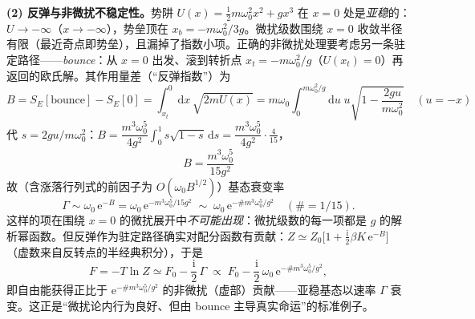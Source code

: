 \textbf{(2) 反弹与非微扰不稳定性。}势阱 $U(x)=\frac12m\omega_0^{2}x^{2}+gx^{3}$ 在 $x=0$ 处是\emph{亚稳}的：$U\to-\infty$（$x\to-\infty$），势垒顶在 $x_b=-m\omega_0^{2}/3g$。微扰级数围绕 $x=0$ 收敛半径有限（最近奇点即势垒），且漏掉了指数小项。正确的非微扰处理要考虑另一条驻定路径——\emph{bounce}：从 $x=0$ 出发、滚到转折点 $x_t=-m\omega_0^{2}/g$（$U(x_t)=0$）再返回的欧氏解。其作用量差（“反弹指数”）为
\begin{equation*}
B=S_E[\text{bounce}]-S_E[0]
=\int_{x_t}^{0}\mathrm{d}x\,\sqrt{2mU(x)}
=m\omega_0\int_0^{m\omega_0^{2}/g}\mathrm{d}u\;u\sqrt{1-\frac{2gu}{m\omega_0^{2}}}
\quad(u=-x)
\end{equation*}
代 $s=2gu/m\omega_0^{2}$：$B=\dfrac{m^{3}\omega_0^{5}}{4g^{2}}\int_0^1s\sqrt{1-s}\,\mathrm{d}s
=\dfrac{m^{3}\omega_0^{5}}{4g^{2}}\cdot\frac{4}{15}$，
\begin{equation*}
\boxed{\;B=\frac{m^{3}\omega_0^{5}}{15g^{2}}\;}
\end{equation*}
故（含涨落行列式的前因子为 $O(\omega_0 B^{1/2})$）基态衰变率
\begin{equation*}
\Gamma\sim\omega_0\,\mathrm{e}^{-B}
=\omega_0\,\mathrm{e}^{-m^{3}\omega_0^{5}/15g^{2}}
\;\sim\;\omega_0\,\mathrm{e}^{-\#m^{3}\omega_0^{5}/g^{2}}
\quad(\#=1/15) .
\end{equation*}
这样的项在围绕 $x=0$ 的微扰展开中\emph{不可能出现}：微扰级数的每一项都是 $g$ 的解析幂函数。但反弹作为驻定路径确实对配分函数有贡献：$Z\simeq Z_0\big[1+\frac{\mathrm{i}}{2}\beta K\,\mathrm{e}^{-B}\big]$（虚数来自反转点的半经典积分），于是
\begin{equation*}
F=-T\ln Z\simeq F_0-\frac{\mathrm{i}}{2}\,\Gamma\;\propto\;F_0-\frac{\mathrm{i}}{2}\,\omega_0\,\mathrm{e}^{-\#m^{3}\omega_0^{5}/g^{2}} ,
\end{equation*}
即自由能获得正比于 $\mathrm{e}^{-\#m^{3}\omega_0^{5}/g^{2}}$ 的非微扰（虚部）贡献——亚稳基态以速率 $\Gamma$ 衰变。这正是“微扰论内行为良好、但由 bounce 主导真实命运”的标准例子。

